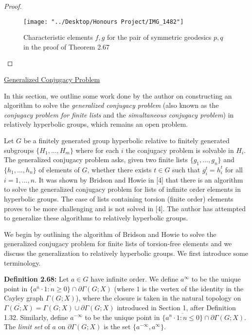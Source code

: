 \documentclass[12pt]{article}
\newcommand{\vs}{\vskip10pt}
\begin{document}
\begin{proof}
		
\begin{figure} [H]
	\centering
	\texttt{[image: "../Desktop/Honours Project/IMG\_1482"]}
	\caption{Characteristic elements $f,g$ for the pair of symmetric geodesics $p,q$ in the proof of Theorem 2.67}
	\label{fig:img1482}
\end{figure}
		
	\end{proof}
	
	\underline{Generalized Conjugacy Problem}

	\vs 
	
	In this section, we outline some work done by the author on constructing an algorithm to solve the \textit{generalized conjugacy problem} (also known as the \textit{conjugacy problem for finite lists} and the \textit{simultaneous conjugacy problem}) in relatively hyperbolic groups, which remains an open problem. 
	
	\vs 
	
	Let $G$ be a finitely generated group hyperbolic relative to finitely generated subgroups $\{H_1,...,H_m\}$ where for each $i$ the conjugacy problem is solvable in $H_i$. The generalized conjugacy problem asks, given two finite lists $\{g_1,...,g_n\}$ and $\{h_1,...,h_n\}$ of elements of $G$, whether there exists $t \in G$ such that $g_i^t = h_i^t$ for all $i = 1,...,n$. It was shown by Bridson and Howie in [4] that there is an algorithm to solve the generalized conjugacy problem for lists of infinite order elements in hyperbolic groups. The case of lists containing torsion (finite order) elements proves to be more challenging and is not solved in [4]. The author has attempted to generalize these algorithms to relatively hyperbolic groups. 
	
	\vs 
	
	We begin by outlining the algorithm of Bridson and Howie to solve the generalized conjugacy problem for finite lists of torsion-free elements and we discuss the generalization to relatively hyperbolic groups. We first introduce some terminology. 
	
	\vs 
	
	\textbf{Definition 2.68: } Let $a \in G$ have infinite order. We define $a^{\infty}$ to be the unique point in $\overline{\{a^n \cdot 1: n \geq 0\}} \cap \partial \Gamma(G; X)$ (where $1$ is the vertex of the identity in the Cayley graph $\Gamma(G; X)$), where the closure is taken in the natural topology on $\overline{\Gamma(G; X)} = \Gamma(G; X) \cup \partial \Gamma(G; X)$ introduced in Section 1, after Definition 1.32. Similarly, define $a^{-\infty}$ to be the unique point in $\overline{\{a^n \cdot 1: n \leq 0\}} \cap \partial \Gamma(G; X)$. The \textit{limit set} of $a$ on $\partial \Gamma(G; X)$ is the set $\{a^{-\infty}, a^{\infty}\}$. 
	
\end{document}
